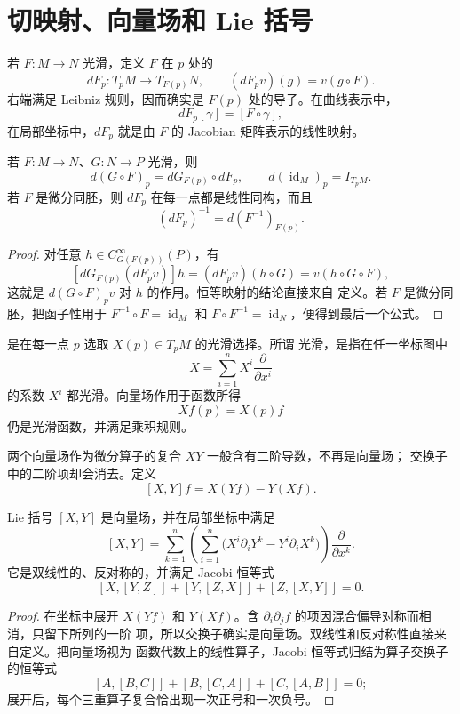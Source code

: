 \section{切映射、向量场和 Lie 括号}

若 \(F:M\to N\) 光滑，定义 \(F\) 在 \(p\) 处的
\[
 dF_p:T_pM\longrightarrow T_{F(p)}N,\qquad
 (dF_pv)(g)=v(g\circ F).
\]
右端满足 Leibniz 规则，因而确实是 \(F(p)\) 处的导子。在曲线表示中，
\[
 dF_p[\gamma]=[F\circ\gamma],
\]
在局部坐标中，\(dF_p\) 就是由 \(F\) 的 Jacobian 矩阵表示的线性映射。

\begin{proposition}[切映射的函子性]
\label{prop:tangent-map-functoriality}
若 \(F:M\to N\)、\(G:N\to P\) 光滑，则
\[
 d(G\circ F)_p=dG_{F(p)}\circ dF_p,
 \qquad d(\operatorname{id}_M)_p=I_{T_pM}.
\]
若 \(F\) 是微分同胚，则 \(dF_p\) 在每一点都是线性同构，而且
\[
 (dF_p)^{-1}=d(F^{-1})_{F(p)}.
\]
\end{proposition}

\begin{proof}
对任意 \(h\in C_{G(F(p))}^\infty(P)\)，有
\[
 [dG_{F(p)}(dF_pv)]h
 =(dF_pv)(h\circ G)
 =v(h\circ G\circ F),
\]
这就是 \(d(G\circ F)_pv\) 对 \(h\) 的作用。恒等映射的结论直接来自
定义。若 \(F\) 是微分同胚，把函子性用于
\(F^{-1}\circ F=\operatorname{id}_M\) 和
\(F\circ F^{-1}=\operatorname{id}_N\)，便得到最后一个公式。
\end{proof}

是在每一点 \(p\) 选取 \(X(p)\in T_pM\) 的光滑选择。所谓
光滑，是指在任一坐标图中
\[
 X=\sum_{i=1}^nX^i\frac{\partial}{\partial x^i}
\]
的系数 \(X^i\) 都光滑。向量场作用于函数所得
\[
 Xf(p)=X(p)f
\]
仍是光滑函数，并满足乘积规则。

两个向量场作为微分算子的复合 \(XY\) 一般含有二阶导数，不再是向量场；
交换子中的二阶项却会消去。定义
\[
 [X,Y]f=X(Yf)-Y(Xf).
\]

\begin{proposition}
\label{prop:lie-bracket-properties}
Lie 括号 \([X,Y]\) 是向量场，并在局部坐标中满足
\[
 [X,Y]
 =\sum_{k=1}^n
 \left(\sum_{i=1}^n
  \bigl(X^i\partial_iY^k-Y^i\partial_iX^k\bigr)\right)
 \frac{\partial}{\partial x^k}.
\]
它是双线性的、反对称的，并满足 Jacobi 恒等式
\[
 [X,[Y,Z]]+[Y,[Z,X]]+[Z,[X,Y]]=0.
\]
\end{proposition}

\begin{proof}
在坐标中展开 \(X(Yf)\) 和 \(Y(Xf)\)。含
\(\partial_i\partial_j f\) 的项因混合偏导对称而相消，只留下所列的一阶
项，所以交换子确实是向量场。双线性和反对称性直接来自定义。把向量场视为
函数代数上的线性算子，Jacobi 恒等式归结为算子交换子的恒等式
\[
 [A,[B,C]]+[B,[C,A]]+[C,[A,B]]=0;
\]
展开后，每个三重算子复合恰出现一次正号和一次负号。
\end{proof}

